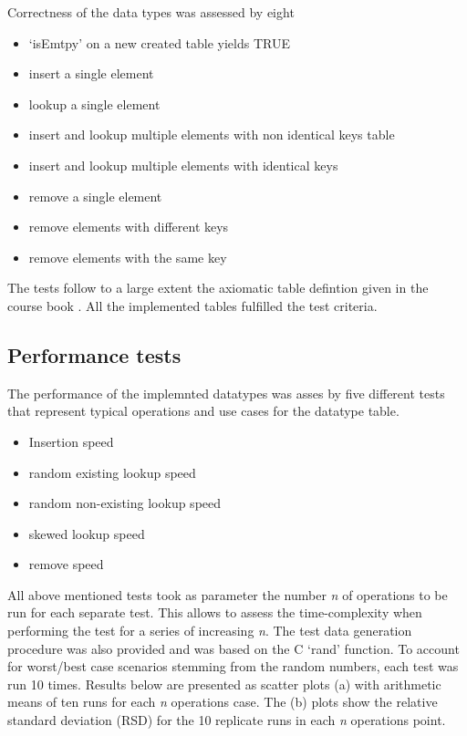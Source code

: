 \documentclass[a4paper,11pt,twoside]{article}
\begin{document}
Correctness of the data types was assessed by eight
\begin{itemize}
\item `isEmtpy' on a new created table yields TRUE
\item insert a single element
\item lookup a single element
\item insert and lookup multiple elements with non identical keys
table
\item insert and lookup multiple elements with identical keys
\item remove a single element
\item remove elements with different keys
\item remove elements with the same key
\end{itemize}

The tests follow to a large extent the axiomatic table defintion given
in the course book \cite[p 122]{janlert2000}. All the implemented
tables fulfilled the test criteria.

\subsection{Performance tests}
The performance of the implemnted datatypes was asses by five
different tests that represent typical operations and use cases for
the datatype table. 

\begin{itemize}
\item Insertion speed
\item random existing lookup speed
\item random non-existing lookup speed 
\item skewed lookup speed
\item remove speed  
\end{itemize}

All above mentioned tests took as parameter the number \textit {n} 
of operations to be run for each separate test. This allows to assess the
time-complexity when performing the test for a series of increasing
\textit{n}. The test data generation procedure was also provided and
was based on the C `rand' function. To account for worst/best case
scenarios stemming from the random numbers, each test was run 10
times. Results below are presented as scatter plots (a) with
arithmetic means of ten runs for each \textit{n} operations case. 
The (b) plots show the relative standard deviation (RSD) for the 10
replicate runs in each \textit{n} operations point.  
\end{document}
